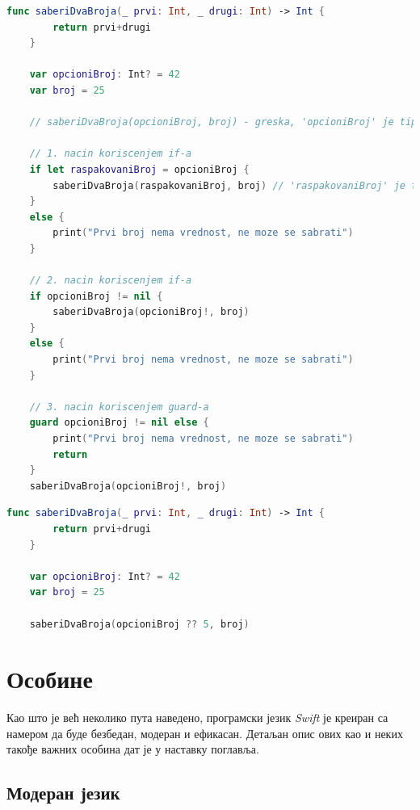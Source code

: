 \documentclass[12pt,oneside]{memoir}
\begin{document}
\begin{lstlisting}[caption=\textit{{Одмотавање опционе променљиве коришћењем услова}}, label={lst:Одмотавање опционе променљиве коришћењем услова}, language=Swift, frame=single]
    func saberiDvaBroja(_ prvi: Int, _ drugi: Int) -> Int {
        return prvi+drugi
    }
    
    var opcioniBroj: Int? = 42
    var broj = 25
    
    // saberiDvaBroja(opcioniBroj, broj) - greska, 'opcioniBroj' je tipa 'Int?' dok funkcija ocekuje parametar tipa 'Int'
    
    // 1. nacin koriscenjem if-a
    if let raspakovaniBroj = opcioniBroj {
        saberiDvaBroja(raspakovaniBroj, broj) // 'raspakovaniBroj' je tipa 'Int'
    }
    else {
        print("Prvi broj nema vrednost, ne moze se sabrati")
    }
    
    // 2. nacin koriscenjem if-a
    if opcioniBroj != nil {
        saberiDvaBroja(opcioniBroj!, broj)
    }
    else {
        print("Prvi broj nema vrednost, ne moze se sabrati")
    }
    
    // 3. nacin koriscenjem guard-a
    guard opcioniBroj != nil else {
        print("Prvi broj nema vrednost, ne moze se sabrati")
        return
    }
    saberiDvaBroja(opcioniBroj!, broj)
\end{lstlisting}

\begin{lstlisting}[caption=\textit{{Одмотавање опционе променљиве задавањем подразумеване вредности}}, label={lst:Одмотавање опционе променљиве задавањем подразумеване вредности}, language=Swift, frame=single]
    func saberiDvaBroja(_ prvi: Int, _ drugi: Int) -> Int {
        return prvi+drugi
    }
    
    var opcioniBroj: Int? = 42
    var broj = 25
    
    saberiDvaBroja(opcioniBroj ?? 5, broj)
\end{lstlisting}

\section{Особине}

\indent Као што је већ неколико пута наведено, програмски језик \textit{Swift} је креиран са намером да буде безбедан, модеран и ефикасан. Детаљан опис ових као и неких такође важних особина дат је у наставку поглавља. 

\subsection{Модеран језик}
\label{sec:Модеран}
\end{document}
